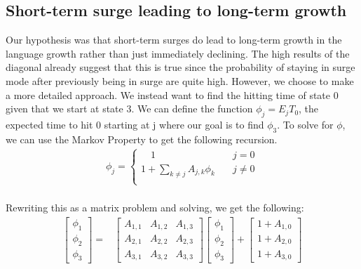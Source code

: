 \documentclass[12pt]{article}
\begin{document}
\subsection{Short-term surge leading to long-term growth}
Our hypothesis was that short-term surges do lead to long-term growth in the language growth rather than just immediately declining. The high results of the diagonal already suggest that this is true since the probability of staying in surge mode after previously being in surge are quite high. However, we choose to make a more detailed approach. We instead want to find the hitting time of state 0 given that we start at state 3. We can define the function $\phi_j = E_j T_0$, the expected time to hit 0 starting at j where our goal is to find $\phi_3$. To solve for $\phi$, we can use the Markov Property to get the following recursion.
\begin{align*}
\phi_j = \begin{cases}
       \quad 1 &\quad j = 0\\
       1+\sum_{k \neq j} A_{j,k}\phi_k &\quad j \neq 0 \\ 
     \end{cases}
\end{align*}\\
Rewriting this as a matrix problem and solving, we get the following:\\
\begin{align*}
    \begin{bmatrix} \phi_1 \\ \phi_2 \\ \phi_3 \end{bmatrix}  =& \begin{bmatrix} A_{1,1}  & A_{1,2} & A_{1,3} \\ A_{2,1} & A_{2,2} & A_{2,3} \\ A_{3,1} & A_{3,2} & A_{3,3} \end{bmatrix} \begin{bmatrix} \phi_1 \\ \phi_2 \\ \phi_3 \end{bmatrix} + \begin{bmatrix}1+A_{1,0} \\ 1+A_{2,0} \\ 1+A_{3,0}\end{bmatrix}\\\\
\end{align*}
\end{document}
